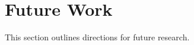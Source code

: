 \chapter{Future Work}
\label{chap:future_work}

This section outlines directions for future research.
